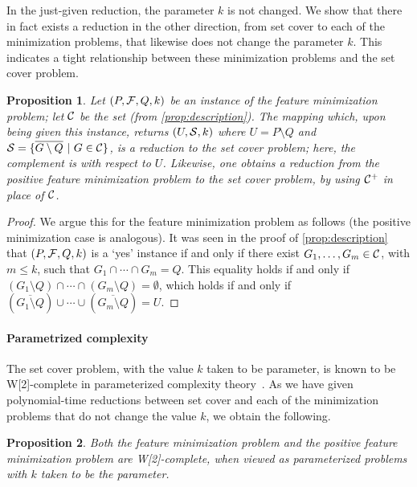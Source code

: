 \documentclass[11pt,a4paper]{article}
\newtheorem{proposition}{Proposition}
\begin{document}
In the just-given reduction, the parameter $k$ is not changed.
We show that there in fact exists a reduction in the other 
direction, from set cover to each of the minimization
problems, that likewise does not change the parameter $k$.
This indicates a tight relationship between
these minimization problems and the set cover problem.

\begin{proposition}
Let $(P,\mathcal{F},Q,k)$ be an instance of the
feature minimization problem; let $\mathcal{C}$
be the set (from \cref{prop:description}).
The mapping which, upon being given this instance, returns $(U, \mathcal{S}, k)$
where $U = P \setminus Q$ and $\mathcal{S} = \{ \overline{G \setminus Q} ~|~ G \in \mathcal{C} \}$,
is a reduction to the set cover problem; here, the complement is with respect to $U$.
Likewise, one obtains a reduction from the positive feature minimization problem to the set cover problem, by using $\mathcal{C}^{+}$ in place of $\mathcal{C}$.
\end{proposition}

\begin{proof}
We argue this for the feature minimization problem as follows (the positive minimization case is analogous).
It was seen in the proof of \cref{prop:description} that $(P,\mathcal{F},Q,k)$ is a `yes' instance
if and only if there exist $G_1, \ldots, G_m \in \mathcal{C}$, with $m \leq k$,
such that $G_1 \cap \cdots \cap G_m = Q$.
This equality holds if and only if
$(G_1 \setminus Q) \cap \cdots \cap (G_m \setminus Q) = \emptyset$,
which holds if and only if
$(\overline{G_1 \setminus Q}) \cup \cdots \cup 
(\overline{G_m \setminus Q}) = U$.
\end{proof}

\paragraph{Parametrized complexity} The set cover problem, with the value $k$ taken to be parameter, is known to be W[2]-complete
in parameterized complexity theory~\cite[Theorem 13.21]{cygan15}.  
As we have given polynomial-time reductions
between set cover and each of the minimization problems
that do not change the value $k$, we obtain the following.

\begin{proposition}
Both the feature minimization problem and the 
positive feature minimization problem
are W[2]-complete,
when
viewed as parameterized problems with $k$ taken to be the parameter.
\end{proposition}
\end{document}
